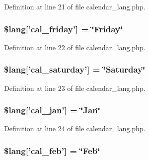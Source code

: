 Definition at line 21 of file calendar\-\_\-lang.\-php.

\hypertarget{calendar__lang_8php_a5be751a9260fe00120263d6e1f41de8c}{
\subsubsection[{\$lang}]{\setlength{\rightskip}{0pt plus 5cm}\$lang\mbox{[}'cal\-\_\-friday'\mbox{]} = \char`\"{}Friday\char`\"{}}}\label{calendar__lang_8php_a5be751a9260fe00120263d6e1f41de8c}


Definition at line 22 of file calendar\-\_\-lang.\-php.

\hypertarget{calendar__lang_8php_aff3fc79a60ccf1f09bfe1f4387105c4b}{
\subsubsection[{\$lang}]{\setlength{\rightskip}{0pt plus 5cm}\$lang\mbox{[}'cal\-\_\-saturday'\mbox{]} = \char`\"{}Saturday\char`\"{}}}\label{calendar__lang_8php_aff3fc79a60ccf1f09bfe1f4387105c4b}


Definition at line 23 of file calendar\-\_\-lang.\-php.

\hypertarget{calendar__lang_8php_a830b34d4425cdab2632056ef2860de62}{
\subsubsection[{\$lang}]{\setlength{\rightskip}{0pt plus 5cm}\$lang\mbox{[}'cal\-\_\-jan'\mbox{]} = \char`\"{}Jan\char`\"{}}}\label{calendar__lang_8php_a830b34d4425cdab2632056ef2860de62}


Definition at line 24 of file calendar\-\_\-lang.\-php.

\hypertarget{calendar__lang_8php_ac26ad55691325913e5d0f7156c95ff18}{
\subsubsection[{\$lang}]{\setlength{\rightskip}{0pt plus 5cm}\$lang\mbox{[}'cal\-\_\-feb'\mbox{]} = \char`\"{}Feb\char`\"{}}}\label{calendar__lang_8php_ac26ad55691325913e5d0f7156c95ff18}


